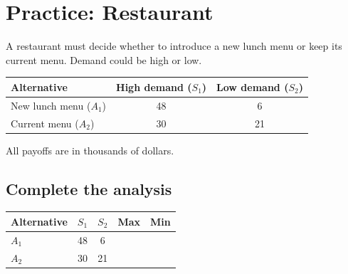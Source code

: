 	
	\section{Practice: Restaurant}
	
	A restaurant must decide whether to introduce a new lunch menu or keep
	its current menu. Demand could be high or low.
	
	\begin{center}
		\renewcommand{\arraystretch}{1.3}
		\begin{tabular}{lcc}
			\toprule
			Alternative & High demand ($S_1$) & Low demand ($S_2$) \\
			\midrule
			New lunch menu ($A_1$) & 48 & 6 \\
			Current menu ($A_2$) & 30 & 21 \\
			\bottomrule
		\end{tabular}
	\end{center}
	
	All payoffs are in thousands of dollars.
	
	\subsection*{Complete the analysis}
	
	\begin{center}
		\renewcommand{\arraystretch}{1.8}
		\begin{tabular}{lcccc}
			\toprule
			Alternative & $S_1$ & $S_2$ & Max & Min \\
			\midrule
			$A_1$ & 48 & 6 & \underline{\hspace{2cm}} & \underline{\hspace{2cm}}\\[3pt]
			$A_2$ & 30 & 21 & \underline{\hspace{2cm}} & \underline{\hspace{2cm}}\\
			\bottomrule
		\end{tabular}
	\end{center}
	
